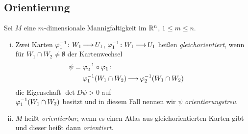 \documentclass[skript.tex]{subfiles}
\begin{document}
	\begin{center}
	\end{center}
	\newpage
	\subsection*{Orientierung\footnotemark}
	\begin{defin}
		Sei $M$ eine $m$-dimensionale Mannigfaltigkeit im ${\mathbb{R}^n}$, $1 \leq m \leq n$.\\
		\begin{minipage}{.5\textwidth}
			\begin{enumerate}[(i)]
				\item Zwei Karten $\varphi_1^{-1} \colon W_1 \kern -1pt \longrightarrow \kern -1pt U_1$, $\varphi_1^{-1} \colon W_1 \kern -1pt \longrightarrow \kern -1pt U_1$ heißen \emph{gleichorientiert}, wenn für $W_1 \cap W_2 \neq \emptyset$ der Kartenwechsel
				\begin{align*}
					\hspace{-2em}
					\psi = \vphi_2^{-1}&\circ\vphi_1 \colon\\ \vphi_1^{-1}&(W_1 \cap W_2) \to \vphi_2^{-1}(W_1 \cap W_2)
				\end{align*}
				die Eigenschaft $\det D\psi > 0$ auf\\$\varphi_1^{-1}(W_1 \cap W_2)$ besitzt und in diesem Fall nennen wir $\psi$ \emph{orientierungstreu}.
				\item $M$ heißt \emph{orientierbar}, wenn es einen Atlas aus gleichorientierten Karten gibt und dieser heißt dann \emph{orientiert}.
			\end{enumerate}
		\end{minipage}
		\hfill
	\end{defin}
\end{document}
